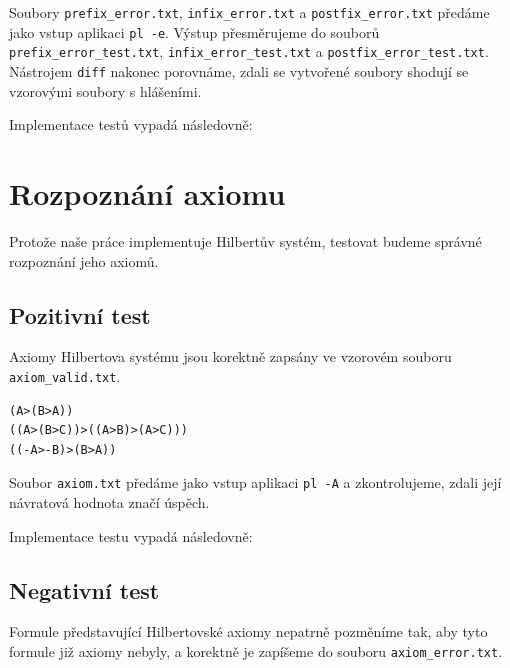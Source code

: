 \documentclass[thesis=B,czech,hidelinks]{thesis}[2012/06/26]
\begin{document}
Soubory \texttt{prefix\_error.txt}, \texttt{infix\_error.txt} a \texttt{postfix\_error.txt} předáme jako vstup aplikaci \texttt{pl -e}. Výstup přesměrujeme do souborů \texttt{prefix\_error\_test.txt}, \texttt{infix\_error\_test.txt} a \texttt{postfix\_error\_test.txt}. Nástrojem \texttt{diff} nakonec porovnáme, zdali se vytvořené soubory shodují se vzorovými soubory s hlášeními.

Implementace testů vypadá následovně:

\begin{center}

\end{center}

\section{Rozpoznání axiomu}

Protože naše práce implementuje Hilbertův systém, testovat budeme správné rozpoznání jeho axiomů.

\subsection{Pozitivní test}

Axiomy Hilbertova systému jsou korektně zapsány ve vzorovém souboru \texttt{axiom\_valid.txt}.

\begin{verbatim}
(A>(B>A))
((A>(B>C))>((A>B)>(A>C)))
((-A>-B)>(B>A))
\end{verbatim}

Soubor \texttt{axiom.txt} předáme jako vstup aplikaci \texttt{pl -A} a zkontrolujeme, zdali její návratová hodnota značí úspěch.

Implementace testu vypadá následovně:

\begin{center}

\end{center}

\subsection{Negativní test}

Formule představující Hilbertovské axiomy nepatrně pozměníme tak, aby tyto formule již axiomy nebyly, a korektně je zapíšeme do souboru \texttt{axiom\_error.txt}.
\end{document}
